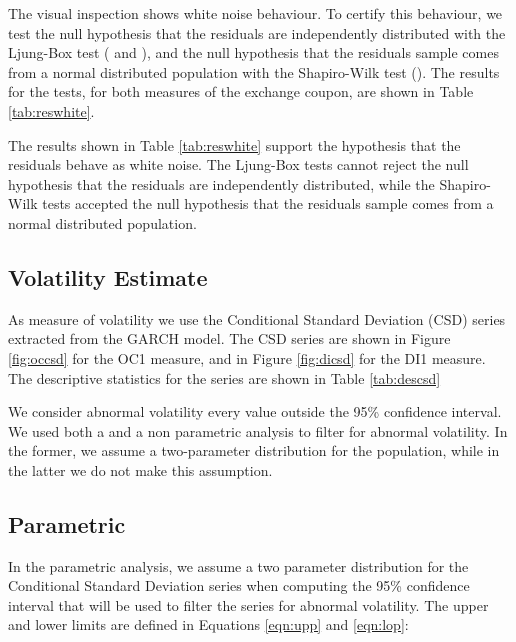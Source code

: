 \documentclass[cic,tc, english]{iiufrgs}
\begin{document}
    

    

    The visual inspection shows white noise behaviour. To certify this behaviour, we test the null hypothesis that the residuals are independently distributed with the Ljung-Box test (\citet{boxpierce} and \citet{ljungbox}), and the null hypothesis that the residuals sample comes from a normal distributed population with the Shapiro-Wilk test (\citet{shapirowilk}). The results for the tests, for both measures of the exchange coupon, are shown in Table \ref{tab:reswhite}.

    

    The results shown in Table \ref{tab:reswhite} support the hypothesis that the residuals behave as white noise. The Ljung-Box tests cannot reject the null hypothesis that the residuals are independently distributed, while the Shapiro-Wilk tests accepted the null hypothesis that the residuals sample comes from a normal distributed population.

\subsection{Volatility Estimate}

    As measure of volatility we use the Conditional Standard Deviation (CSD) series extracted from the GARCH model. The CSD series are shown in Figure \ref{fig:occsd} for the OC1 measure, and in Figure \ref{fig:dicsd} for the DI1 measure. The descriptive statistics for the series are shown in Table \ref{tab:descsd}

    

    

    

    We consider abnormal volatility every value outside the 95\% confidence interval. We used both a  and a non parametric analysis to filter for abnormal volatility. In the former, we assume a two-parameter distribution for the population, while in the latter we do not make this assumption.

\subsection{Parametric}

    In the parametric analysis, we assume a two parameter distribution for the Conditional Standard Deviation series when computing the 95\% confidence interval that will be used to filter the series for abnormal volatility. The upper and lower limits are defined in Equations \ref{eqn:upp} and \ref{eqn:lop}: 
\end{document}
